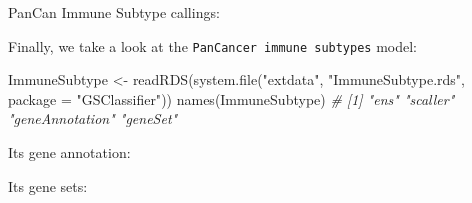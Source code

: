 \documentclass[
  12pt,
]{book}
\newenvironment{Shaded}{\begin{snugshade}}{\end{snugshade}}
\newcommand{\AttributeTok}[1]{\textcolor[rgb]{0.77,0.63,0.00}{#1}}
\newcommand{\CommentTok}[1]{\textcolor[rgb]{0.56,0.35,0.01}{\textit{#1}}}
\newcommand{\FunctionTok}[1]{\textcolor[rgb]{0.00,0.00,0.00}{#1}}
\newcommand{\NormalTok}[1]{#1}
\newcommand{\OtherTok}[1]{\textcolor[rgb]{0.56,0.35,0.01}{#1}}
\newcommand{\SpecialCharTok}[1]{\textcolor[rgb]{0.00,0.00,0.00}{#1}}
\newcommand{\StringTok}[1]{\textcolor[rgb]{0.31,0.60,0.02}{#1}}
\begin{document}
PanCan Immune Subtype callings:

Finally, we take a look at the \texttt{PanCancer\ immune\ subtypes} model:

\begin{Shaded}
\begin{Highlighting}[]
\NormalTok{ImmuneSubtype }\OtherTok{\textless{}{-}} \FunctionTok{readRDS}\NormalTok{(}\FunctionTok{system.file}\NormalTok{(}\StringTok{"extdata"}\NormalTok{, }\StringTok{"ImmuneSubtype.rds"}\NormalTok{, }\AttributeTok{package =} \StringTok{"GSClassifier"}\NormalTok{))}
\FunctionTok{names}\NormalTok{(ImmuneSubtype)}
\CommentTok{\# [1] "ens"            "scaller"        "geneAnnotation" "geneSet"}
\end{Highlighting}
\end{Shaded}

Its gene annotation:

\begin{Shaded}
\end{Shaded}

Its gene sets:
\end{document}
